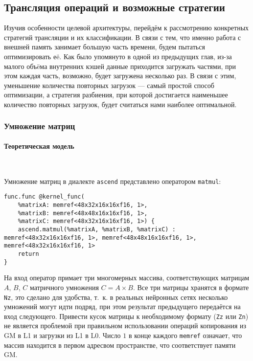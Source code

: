 \subsection{Трансляция операций и возможные стратегии}
\label{impl:lowering} %

\newcommand{\divisible}{\mathop{\raisebox{-2pt}{\vdots}}}

Изучив особенности целевой архитектуры, перейдём к рассмотрению
конкретных стратегий трансляции и их классификации. В связи с тем, что именно
работа с внешней память занимает большую часть времени, будем пытаться
оптимизировать еë. Как было упомянуто в одной из предыдущих глав, из-за малого
объëма внутренних кэшей данные приходится загружать частями, при этом каждая часть,
возможно, будет загружена несколько раз. В связи с этим, уменьшение количества
повторных загрузок --- самый простой способ оптимизации, а стратегия разбиения,
при которой достигается наименьшее количество повторных загрузок, будет считаться
нами наиболее оптимальной.

\subsubsection{Умножение матриц}

\paragraph{Теоретическая модель}~

Умножение матриц в диалекте \texttt{ascend} представлено оператором \texttt{matmul}:

\begin{lstlisting}[caption={Пример использования оператора \texttt{matmul}}]
func.func @kernel_func(
    %matrixA: memref<48x32x16x16xf16, 1>,
    %matrixB: memref<48x48x16x16xf16, 1>,
    %matrixC: memref<48x32x16x16xf16, 1>) {
    ascend.matmul(%matrixA, %matrixB, %matrixC) : memref<48x32x16x16xf16, 1>, memref<48x48x16x16xf16, 1>, memref<48x32x16x16xf16, 1>
    return
}
\end{lstlisting}

На вход оператор примает три многомерных массива, соответствующих матрицам
$A$, $B$, $C$ матричного умножения $C = A \times B$. Все три матрицы хранятся
в формате \texttt{Nz}, это сделано для удобства, т.~к. в реальных нейронных сетях
несколько умножений могут идти подряд, при этом результат предыдущего
передаётся на вход следующего. Привести кусок матрицы к необходимому формату
(\texttt{Zz} или \texttt{Zn}) не является проблемой при правильном использовании
операций копирования из GM в L1 и загрузки из L1 в L0. Число $1$ в конце каждого
\texttt{memref} означает, что массив находится в первом адресвом пространстве, что
соответствует памяти GM.

